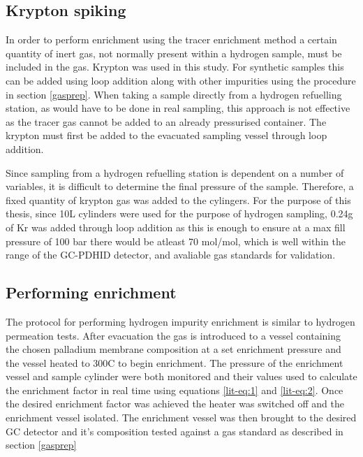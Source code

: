 \subsection{Krypton spiking}
In order to perform enrichment using the tracer enrichment method a certain quantity of inert gas, not normally present within a hydrogen sample, must be included in the gas. Krypton was used in this study. For synthetic samples this can be added using loop addition along with other impurities using the procedure in section \ref{gasprep}. When taking a sample directly from a hydrogen refuelling station, as would have to be done in real sampling, this approach is not effective as the tracer gas cannot be added to an already pressurised container. The krypton must first be added to the evacuated sampling vessel through loop addition.

Since sampling from a hydrogen refuelling station is dependent on a number of variables, it is difficult to determine the final pressure of the sample. Therefore, a fixed quantity of krypton gas was added to the cylingers. For the purpose of this thesis, since 10L cylinders were used for the purpose of hydrogen sampling, 0.24g of Kr was added through loop addition as this is enough to ensure at a max fill pressure of 100 bar there would be atleast 70 \textmu mol/mol, which is well within the range of the GC-PDHID detector, and avaliable gas standards for validation. 

\subsection{Performing enrichment}
The protocol for performing hydrogen impurity enrichment is similar to hydrogen permeation tests. After evacuation the gas is introduced to a vessel containing the chosen palladium membrane composition at a set enrichment pressure and the vessel heated to 300\textdegree C to begin enrichment. The pressure of the enrichment vessel and sample cylinder were both monitored and their values used to calculate the enrichment factor in real time using equations \ref{lit-eq:1} and \ref{lit-eq:2}. Once the desired enrichment factor was achieved the heater was switched off and the enrichment vessel isolated. The enrichment vessel was then brought to the desired GC detector and it's composition tested against a gas standard as described in section \ref{gasprep}


